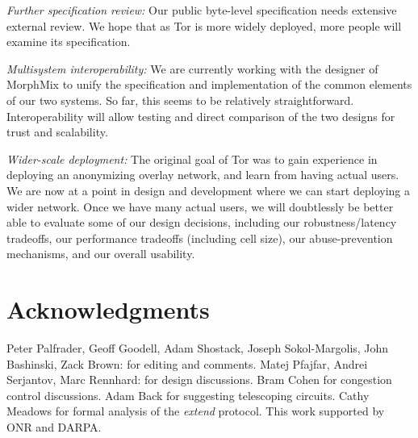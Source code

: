 \documentclass[times,10pt,twocolumn]{article}
\begin{document}
\emph{Further specification review:} Our public
byte-level specification \cite{tor-spec} needs
extensive external review.  We hope that as Tor
is more widely deployed, more people will examine its
specification.

\emph{Multisystem interoperability:} We are currently working with the
designer of MorphMix to unify the specification and implementation of
the common elements of our two systems. So far, this seems
to be relatively straightforward.  Interoperability will allow testing
and direct comparison of the two designs for trust and scalability.

\emph{Wider-scale deployment:} The original goal of Tor was to
gain experience in deploying an anonymizing overlay network, and
learn from having actual users.  We are now at a point in design
and development where we can start deploying a wider network.  Once
we have many actual users, we will doubtlessly be better
able to evaluate some of our design decisions, including our
robustness/latency tradeoffs, our performance tradeoffs (including
cell size), our abuse-prevention mechanisms, and
our overall usability.


\section*{Acknowledgments}
 Peter Palfrader, Geoff Goodell, Adam Shostack, Joseph Sokol-Margolis,
   John Bashinski, Zack Brown:
   for editing and comments.
 Matej Pfajfar, Andrei Serjantov, Marc Rennhard: for design discussions.
 Bram Cohen for congestion control discussions.
 Adam Back for suggesting telescoping circuits.
 Cathy Meadows for formal analysis of the \emph{extend} protocol.
 This work supported by ONR and DARPA.




\end{document}
